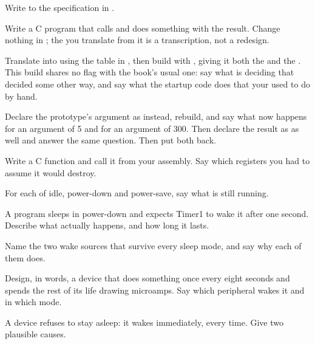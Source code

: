 \label{c6:ex:capstone}
Write  to the specification in .
\begin{parts}
  \item Write a C program that calls  and does something with the result. Change
    nothing in ; the  you translate from it is a transcription,
    not a redesign.
  \item Translate  into  using the table in
    , then build with , giving it both the  and the
    . This build shares no flag with the book's usual one: say what
     is deciding that  decided some other way, and say what the
    startup code does that your  used to do by hand.
  \item Declare the prototype's argument as  instead, rebuild, and say what now
    happens for an argument of 5 and for an argument of 300. Then declare the result as
     as well and answer the same question. Then put both back.
  \item Write a C function and call it from your assembly. Say which registers you had to assume it
    would destroy.
\end{parts}

\label{c6:ex:sleep}
\begin{parts}
  \item For each of idle, power-down and power-save, say what is still running.
  \item A program sleeps in power-down and expects Timer1 to wake it after one second. Describe
    what actually happens, and how long it lasts.
  \item Name the two wake sources that survive every sleep mode, and say why each of them does.
  \item Design, in words, a device that does something once every eight seconds and spends the
    rest of its life drawing microamps. Say which peripheral wakes it and in which mode.
  \item A device refuses to stay asleep: it wakes immediately, every time. Give two plausible
    causes.
\end{parts}

